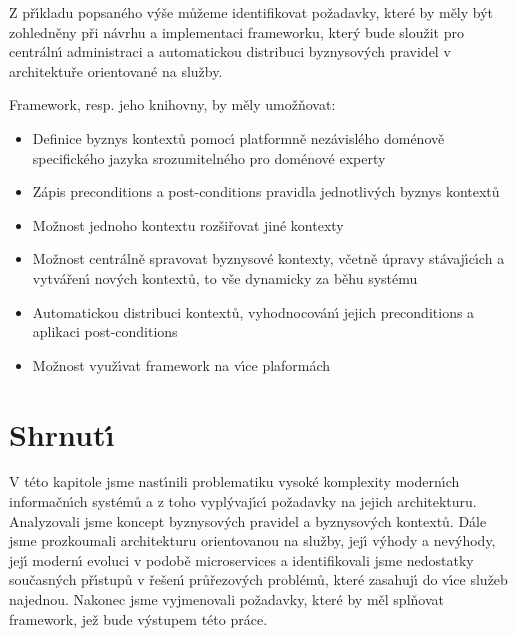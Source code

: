 Z př\'{\i}kladu popsaného v\'yše můžeme identifikovat požadavky, které by měly
b\'yt zohledněny při návrhu a implementaci frameworku, kter\'y bude sloužit
pro centráln\'{\i} administraci a automatickou distribuci byznysov\'ych pravidel
v architektuře orientované na služby.

Framework, resp. jeho knihovny, by měly umožňovat:

\begin{itemize}
    \item{Definice byznys kontextů pomoc\'{\i} platformně nezávislého doménově specifického jazyka srozumitelného pro doménové experty}
    \item{Zápis preconditions a post-conditions pravidla jednotliv\'ych byznys kontextů}
    \item{Možnost jednoho kontextu rozšiřovat jiné kontexty}
    \item{Možnost centrálně spravovat byznysové kontexty, včetně úpravy stávaj\'{\i}c\'{\i}ch a vytvářen\'{\i} nov\'ych kontextů, to vše dynamicky za běhu systému}
    \item{Automatickou distribuci kontextů, vyhodnocován\'{\i} jejich preconditions a aplikaci post-conditions}
    \item{Možnost využ\'{\i}vat framework na v\'{\i}ce plaformách}
\end{itemize}

\section{Shrnut\'{\i}}

V této kapitole jsme nast\'{\i}nili problematiku vysoké komplexity modern\'{\i}ch informačn\'{\i}ch systémů
a z toho vypl\'yvaj\'{\i}c\'{\i} požadavky na jejich architekturu. Analyzovali jsme koncept byznysov\'ych
pravidel a byznysov\'ych kontextů. Dále jsme prozkoumali architekturu orientovanou na služby, jej\'{\i}
v\'yhody a nev\'yhody, jej\'{\i} modern\'{\i} evoluci v podobě microservices a identifikovali jsme nedostatky
současn\'ych př\'{\i}stupů v řešen\'{\i} průřezov\'ych problémů, které zasahuj\'{\i} do v\'{\i}ce služeb najednou. Nakonec
jsme vyjmenovali požadavky, které by měl splňovat framework, jež bude v\'ystupem této práce.
